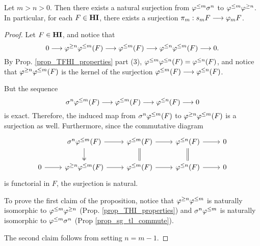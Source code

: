 \begin{prop}\label{prop_struct_consts}
Let $m > n > 0$. Then there exists a natural surjection from 
$\varphi^{\leq m} \sigma^{n}$ to $\varphi^{\leq m} \varphi^{\geq n}$. In particular, for 
each $F \in \mathbf{HI}$, there exists a surjection $\pi_m: s_m F \longrightarrow 
\varphi_{m} F$.
\end{prop}
\begin{proof}
Let $F \in \mathbf{HI}$, and notice that
\[
0 \longrightarrow \varphi^{\geq n} \varphi^{\leq m}(F) \longrightarrow \varphi^{\leq m}(F) \longrightarrow 
  \varphi^{\leq n} \varphi^{\leq m}(F) \longrightarrow 0.
\]
By Prop. \ref{prop_TFHI_properties} part (3), $\varphi^{\leq m} \varphi^{\leq n}(F) 
= \varphi^{\leq n}(F)$, and notice that $\varphi^{\geq n} \varphi^{\leq m}(F)$ is the kernel 
of the surjection $\varphi^{\leq m}(F) \longrightarrow \varphi^{\leq n}(F)$.

But the sequence
\[
\sigma^{n} \varphi^{\leq m}(F) \longrightarrow \varphi^{\leq m}(F) \longrightarrow \varphi^{\leq n}(F) \longrightarrow 0
\]
is exact. Therefore, the induced map from $\sigma^{n} \varphi^{\leq m}(F)$
to $\varphi^{\geq n} \varphi^{\leq m}(F)$ is a surjection as well. Furthermore,
since the commutative diagram
\[
\begin{tikzcd}
{} & \sgHI{n} \tlHI{m}(F) \arrow{r} \arrow[twoheadrightarrow]{d} &
\tlHI{m}(F) \arrow{r} \arrow[equal]{d} &
\tlHI{n}(F) \arrow{r} \arrow[equal]{d} &
0 \\
0 \arrow{r} &
\tgHI{n} \tlHI{m}(F) \arrow{r} &
\tlHI{m}(F) \arrow{r} &
\tlHI{n}(F) \arrow{r} &
0
\end{tikzcd}
\] 
is functorial in $F$, the surjection is natural.

To prove the first claim of the proposition, notice that 
$\varphi^{\geq n} \varphi^{\leq m}$ is naturally isomorphic to $\varphi^{\leq m} \varphi^{\geq n}$ 
(Prop. \ref{prop_THI_properties}) and $\sigma^{n} \varphi^{\leq m}$ is 
naturally isomorphic to $\varphi^{\leq m} \sigma^{n}$ (Prop 
\ref{prop_sg_tl_commute}).

The second claim follows from setting $n = m - 1$.
\end{proof}
